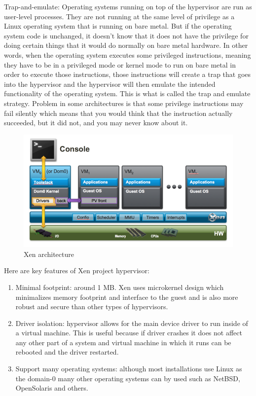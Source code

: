 \begin{enumerate}
Trap-and-emulate: Operating systems running on top of the hypervisor are run as user-level processes. They are not running at the same level of privilege as a Linux operating system that is running on bare metal. But if the operating system code is unchanged, it doesn’t know that it does not have the privilege for doing certain things that it would do normally on bare metal hardware. In other words, when the operating system executes some privileged instructions, meaning they have to be in a privileged mode or kernel mode to run on bare metal in order to execute those instructions, those instructions will create a trap that goes into the hypervisor and the hypervisor will then emulate the intended functionality of the operating system. This is what is called the trap and emulate strategy. Problem in some architectures is that some privilege instructions may fail silently which means that you would think that the instruction actually succeeded, but it did not, and you may never know about it.

\begin{figure}[H]
\centering
\includegraphics[scale=1]{xen-diagram.png}
\caption{Xen architecture}
\end{figure}

Here are key features of Xen project hypervisor:
\begin{enumerate}
\item Minimal footprint: around 1 MB. Xen uses microkernel design which minimalizes memory footprint and interface to the guest and is also more robust and secure than other types of hypervisors.
\item Driver isolation: hypervisor allows for the main device driver to run inside of a virtual machine. This is useful because if driver crashes it does not affect any other part of a system and virtual machine in which it runs can be rebooted and the driver restarted.
\item Support many operating systems: although most installations use Linux as the domain-0 many other operating systems can by used such as NetBSD, OpenSolaris and others.
\end{enumerate}



\end{enumerate}

